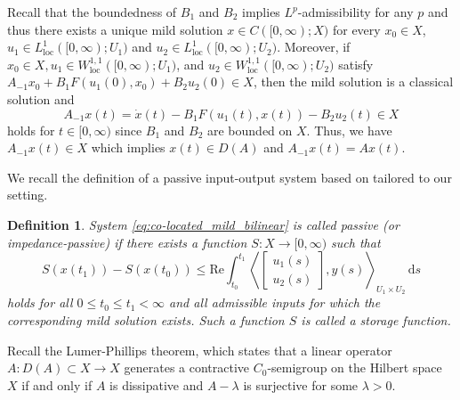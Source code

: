 \documentclass{cocv}
\renewcommand{\Re}{\mathrm{Re}}
\DeclareMathOperator{\loc}{loc}
\newtheorem{definition}{Definition}
\theoremstyle{definition}
\begin{document}
Recall that the boundedness of $B_1$ and $B_2$ implies $L^p$-admissibility for any $p$ and thus there exists a unique mild solution $x \in C([0,\infty);X)$ for every $x_0 \in X$, $u_1 \in L^1_{\loc}([0,\infty);U_1)$ and $u_2 \in L^1_{\loc}([0,\infty);U_2)$.
Moreover, if $x_0 \in X, u_1 \in W^{1,1}_{\loc}([0,\infty);U_1)$, and $u_2 \in W^{1,1}_{\loc}([0,\infty);U_2)$ satisfy $A_{-1}x_0 + B_1F(u_1(0),x_0) + B_2u_2(0) \in X$, then the mild solution is a classical solution and
\[
A_{-1}x(t) = \dot{x}(t) - B_1F(u_1(t),x(t)) - B_2u_2(t) \in X
\]
holds for $t \in [0,\infty)$ since $B_1$ and $B_2$ are bounded on $X$. Thus, we have $A_{-1}x(t) \in X$ which implies $x(t) \in D(A)$ and $A_{-1}x(t)=Ax(t)$. 

We recall the definition of a passive input-output system based on \cite{Staffans2002} tailored to our setting. 
\begin{definition}
System \eqref{eq:co-located_mild_bilinear} is called
\emph{passive} (or \emph{impedance-passive}) if there exists a function
$S\colon X\to[0,\infty)$ such that
\begin{equation}
\label{eq:dissipation}
S(x(t_1))-S(x(t_0))
\le
\Re\int_{t_0}^{t_1}
\left\langle
\begin{bmatrix}u_1(s)\\u_2(s)\end{bmatrix},
y(s)
\right\rangle_{U_1\times U_2}\,\mathrm ds
\end{equation}
holds for all $0\le t_0\le t_1<\infty$ and all admissible inputs for which
the corresponding mild solution exists. Such a function $S$ is called a
\emph{storage function}.
\end{definition}
Recall the Lumer-Phillips theorem, which states that a linear operator $A\colon D(A) \subset X \to X$ generates a contractive $C_0$-semigroup on the Hilbert space $X$ if and only if $A$ is dissipative and $A-\lambda$ is surjective for some $\lambda > 0$. 
\end{document}
